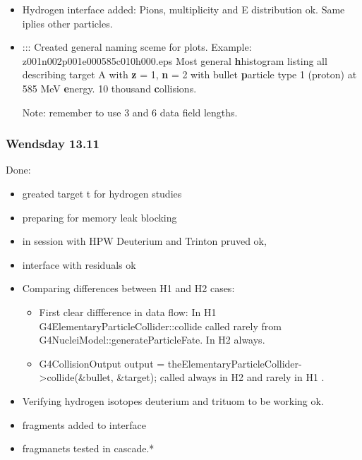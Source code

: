 \begin{itemize}
  
\item Hydrogen interface added: Pions, multiplicity and E distribution
  ok.  Same iplies other particles.
  
\item ::: Created general naming sceme for plots.  Example: {\sf
    z001n002p001e000585c010h000.eps} Most general {\bf h}histogram
  listing all describing target A with {\bf z} = 1, {\bf n} = 2 with
  bullet {\bf p}article type 1 (proton) at 585 MeV {\bf e}nergy. 10
  thousand {\bf c}ollisions.
  
  Note: remember to use 3 and 6 data field lengths.

\end{itemize}

\subsubsection{Wendsday 13.11}

Done:

\begin{itemize}

\item greated target t for hydrogen studies

\item preparing for memory leak blocking

\item in session with HPW Deuterium and Trinton pruved ok,

\item interface with residuals ok

\item Comparing differences between H1 and H2 cases:

\begin{itemize}

\item First clear diffference in data flow: In H1
  G4ElementaryParticleCollider::collide called rarely from
  G4NucleiModel::generateParticleFate. In H2 always.

\item G4CollisionOutput output =
  theElementaryParticleCollider->collide(\&bullet, \&target); 
called always in H2 and rarely in H1 .

\end{itemize}

\item Verifying hydrogen isotopes deuterium and trituom to be working
  ok.

\item fragments added to interface

\item fragmanets tested in cascade.*

\end{itemize}


